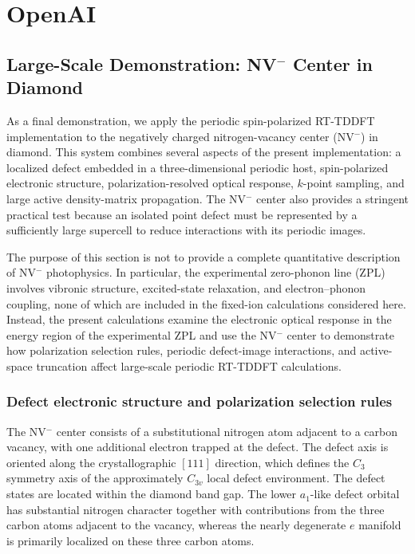 \section{ OpenAI}
\subsection{Large-Scale Demonstration: NV$^-$ Center in Diamond}
\label{sec:nv}

As a final demonstration, we apply the periodic spin-polarized RT-TDDFT
implementation to the negatively charged nitrogen-vacancy center
(NV$^-$) in diamond.\cite{NV-Doherty-2013,NV-Gali-2008,NV-Gali-2019}
This system combines several aspects of the present implementation:
a localized defect embedded in a three-dimensional periodic host,
spin-polarized electronic structure, polarization-resolved optical
response, $k$-point sampling, and large active density-matrix
propagation.  The NV$^-$ center also provides a stringent practical
test because an isolated point defect must be represented by a
sufficiently large supercell to reduce interactions with its periodic
images.

The purpose of this section is not to provide a complete quantitative
description of NV$^-$ photophysics.  In particular, the experimental
zero-phonon line (ZPL) involves vibronic structure, excited-state
relaxation, and electron--phonon coupling, none of which are included
in the fixed-ion calculations considered here.  Instead, the present
calculations examine the electronic optical response in the energy
region of the experimental ZPL and use the NV$^-$ center to demonstrate
how polarization selection rules, periodic defect-image interactions,
and active-space truncation affect large-scale periodic RT-TDDFT
calculations.

\subsubsection{Defect electronic structure and polarization selection rules}

The NV$^-$ center consists of a substitutional nitrogen atom adjacent
to a carbon vacancy, with one additional electron trapped at the
defect.\cite{NV-Doherty-2013,NV-Gali-2008,NV-Gali-2019}
The defect axis is oriented along the crystallographic $[111]$
direction, which defines the $C_3$ symmetry axis of the approximately
$C_{3v}$ local defect environment.  The defect states are located
within the diamond band gap.  The lower $a_1$-like defect orbital has
substantial nitrogen character together with contributions from the
three carbon atoms adjacent to the vacancy, whereas the nearly
degenerate $e$ manifold is primarily localized on these three carbon
atoms.

